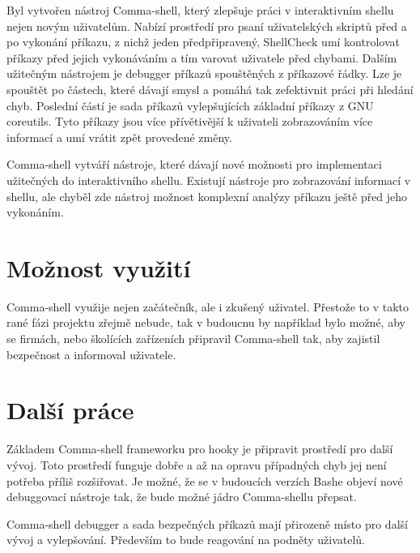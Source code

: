 \documentclass[thesis=M,czech]{FITthesis}[2012/06/26]
\begin{document}
%
%
\begin{conclusion}

Byl vytvořen nástroj Comma-shell, který zlepšuje práci v interaktivním shellu nejen novým uživatelům. Nabízí prostředí pro psaní uživatelských skriptů před a po vykonání příkazu, z nichž jeden předpřipravený, ShellCheck umí kontrolovat příkazy před jejich vykonáváním a tím varovat uživatele před chybami. Dalším užitečným nástrojem je debugger příkazů spouštěných z příkazové řádky. Lze je spouštět po částech, které dávají smysl a pomáhá tak zefektivnit práci při hledání chyb. Poslední částí je sada příkazů vylepšujících základní příkazy z GNU coreutils. Tyto příkazy jsou více přívětivější k uživateli zobrazováním více informací a umí vrátit zpět provedené změny.

Comma-shell vytváří nástroje, které dávají nové možnosti pro implementaci užitečných do interaktivního shellu. Existují nástroje pro zobrazování informací v shellu, ale chyběl zde nástroj možnost komplexní analýzy příkazu ještě před jeho vykonáním.


\section{Možnost využití}

Comma-shell využije nejen začátečník, ale i zkušený uživatel. Přestože to v takto rané fázi projektu zřejmě nebude, tak v budoucnu by například bylo možné, aby se firmách, nebo školících zařízeních připravil Comma-shell tak, aby zajistil bezpečnost a informoval uživatele.


\section{Další práce}

Základem Comma-shell frameworku pro hooky je připravit prostředí pro další vývoj. Toto prostředí funguje dobře a až na opravu případných chyb jej není potřeba příliš rozšiřovat. Je možné, že se v budoucích verzích Bashe objeví nové debuggovací nástroje tak, že bude možné jádro Comma-shellu přepsat.

Comma-shell debugger a sada bezpečných příkazů mají přirozeně místo pro další vývoj a vylepšování. Především to bude reagování na podněty uživatelů.

	
\end{conclusion}
\end{document}
